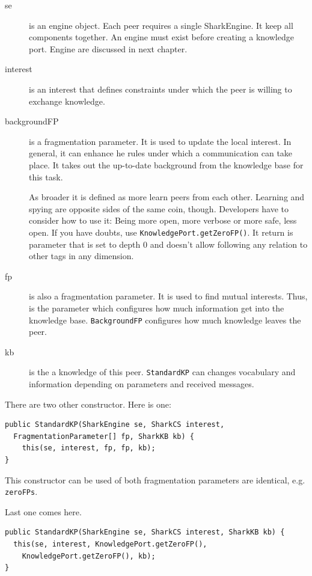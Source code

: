 {\begin{description}
\item[se] is an engine object. Each peer requires a single SharkEngine. It keep all components together. An engine must exist before creating a knowledge port. Engine are discussed in next chapter.

\item[interest] is an interest that defines constraints under which the peer is willing to exchange knowledge.

\item[backgroundFP] is a fragmentation parameter. It is used to update the local interest. In general, it can enhance he rules under which a communication can take place. It takes out the up-to-date background from the knowledge base for this task.

As broader it is defined as more learn peers from each other. Learning and spying are opposite sides of the same coin, though. Developers have to consider how to use it: Being more open, more verbose or more safe, less open. If you have doubts, use {\tt KnowledgePort.getZeroFP()}. It return is parameter that is set to depth 0 and doesn't allow following any relation to other tags in any dimension.

\item[fp] is also a fragmentation parameter. It is used to find mutual interests. Thus, is the parameter which configures how much information get into the knowledge base. {\tt BackgroundFP} configures how much knowledge leaves the peer.

\item[kb] is the a knowledge of this peer. {\tt StandardKP} can changes vocabulary and information depending on parameters and received messages.
\end{description}

There are two other constructor. Here is one:
\begin{verbatim}
public StandardKP(SharkEngine se, SharkCS interest,
  FragmentationParameter[] fp, SharkKB kb) {
    this(se, interest, fp, fp, kb);
}
\end{verbatim}

This constructor can be used of both fragmentation parameters are identical, e.g. {\tt zeroFPs}.

Last one comes here.
\begin{verbatim}
public StandardKP(SharkEngine se, SharkCS interest, SharkKB kb) {
  this(se, interest, KnowledgePort.getZeroFP(),
    KnowledgePort.getZeroFP(), kb);
}
\end{verbatim}

}
